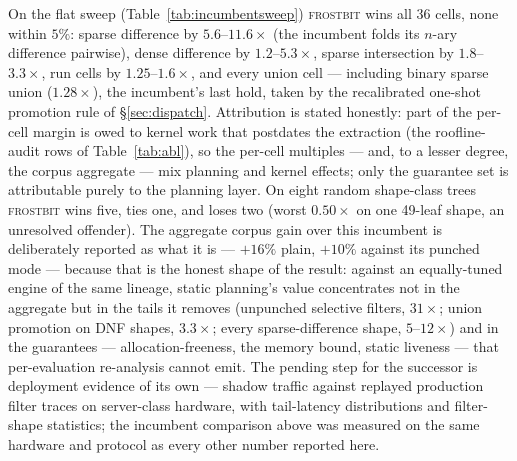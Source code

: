 \documentclass[sigconf,nonacm]{acmart}
\newcommand{\fb}{\textsc{frostbit}}
\begin{document}
On the flat sweep (Table~\ref{tab:incumbentsweep}) \fb{} wins all 36
cells, none within $5\%$:
sparse difference by $5.6$--$11.6\times$ (the incumbent folds its
$n$-ary difference pairwise), dense difference by $1.2$--$5.3\times$,
sparse intersection by $1.8$--$3.3\times$,
run cells by $1.25$--$1.6\times$, and every union cell --- including
binary sparse union ($1.28\times$), the incumbent's last hold, taken
by the recalibrated one-shot promotion rule of \S\ref{sec:dispatch}.
Attribution is stated honestly: part of the per-cell margin is owed to
kernel work that postdates the extraction (the roofline-audit rows of
Table~\ref{tab:abl}), so the per-cell multiples --- and, to a lesser
degree, the corpus aggregate --- mix planning and kernel effects; only
the guarantee set is attributable purely to the planning layer. On eight random shape-class trees \fb{} wins
five, ties one, and loses two (worst $0.50\times$ on one 49-leaf
shape, an unresolved offender). The aggregate corpus gain over this
incumbent is deliberately reported as what it is --- $+16\%$ plain,
$+10\%$ against its punched mode --- because that is the honest shape
of the result: against an equally-tuned engine of the same lineage,
static planning's value concentrates not in the aggregate but in the
tails it removes (unpunched selective filters, $31\times$; union
promotion on DNF shapes, $3.3\times$; every sparse-difference shape,
$5$--$12\times$) and in the guarantees --- allocation-freeness, the
memory bound, static liveness --- that per-evaluation re-analysis
cannot emit. The pending step for the successor is deployment
evidence of its own --- shadow traffic against replayed production
filter traces on server-class hardware, with tail-latency
distributions and filter-shape statistics; the incumbent comparison
above was measured on the same hardware and protocol as every other
number reported here.
\end{document}
